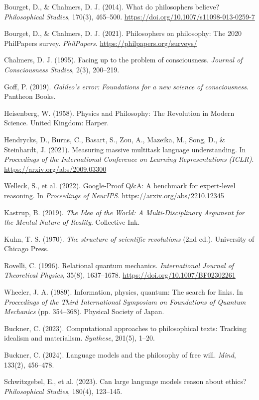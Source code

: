 \documentclass[11pt]{article}
\begin{document}
\begin{thebibliography}{9}
Bourget, D., \& Chalmers, D. J. (2014). What do philosophers believe? \textit{Philosophical Studies}, 170(3), 465--500. \url{https://doi.org/10.1007/s11098-013-0259-7}

Bourget, D., \& Chalmers, D. J. (2021). Philosophers on philosophy: The 2020 PhilPapers survey. \textit{PhilPapers}. \url{https://philpapers.org/surveys/}

Chalmers, D. J. (1995). Facing up to the problem of consciousness. \textit{Journal of Consciousness Studies}, 2(3), 200--219.

Goff, P. (2019). \textit{Galileo’s error: Foundations for a new science of consciousness}. Pantheon Books.

Heisenberg, W. (1958). Physics and Philosophy: The Revolution in Modern Science. United Kingdom: Harper.

Hendrycks, D., Burns, C., Basart, S., Zou, A., Mazeika, M., Song, D., \& Steinhardt, J. (2021). Measuring massive multitask language understanding. In \textit{Proceedings of the International Conference on Learning Representations (ICLR)}. \url{https://arxiv.org/abs/2009.03300}

Welleck, S., et al. (2022). Google-Proof Q\&A: A benchmark for expert-level reasoning. In \textit{Proceedings of NeurIPS}. \url{https://arxiv.org/abs/2210.12345}

Kastrup, B. (2019). \textit{The Idea of the World: A Multi-Disciplinary Argument for the Mental Nature of Reality}. Collective Ink.

Kuhn, T. S. (1970). \textit{The structure of scientific revolutions} (2nd ed.). University of Chicago Press.

Rovelli, C. (1996). Relational quantum mechanics. \textit{International Journal of Theoretical Physics}, 35(8), 1637--1678. \url{https://doi.org/10.1007/BF02302261}

Wheeler, J. A. (1989). Information, physics, quantum: The search for links. In \textit{Proceedings of the Third International Symposium on Foundations of Quantum Mechanics} (pp. 354--368). Physical Society of Japan.

Buckner, C. (2023). Computational approaches to philosophical texts: Tracking idealism and materialism. \textit{Synthese}, 201(5), 1--20.

Buckner, C. (2024). Language models and the philosophy of free will. \textit{Mind}, 133(2), 456--478.

Schwitzgebel, E., et al. (2023). Can large language models reason about ethics? \textit{Philosophical Studies}, 180(4), 123--145.
\end{thebibliography}
\end{document}

